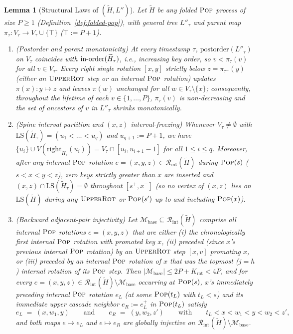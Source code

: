 \documentclass[11pt]{article}
\newtheorem{lemma}[theorem]{Lemma}
\theoremstyle{definition}
\theoremstyle{remark}
\newcommand{\LS}{\mathrm{LS}}
\newcommand{\POP}{\textnormal{\scshape Pop}}
\newcommand{\UPROT}{\textnormal{\scshape UpperRot}}
\begin{document}
\begin{lemma}[Structural Laws of $(\widetilde{H}, L'')$]
\label{lem:folded-laws}
Let $\widetilde{H}$ be any folded $\POP$ process of size $P \ge 1$ (Definition~\ref{def:folded-pop}), with general tree $L''_\tau$ and parent map $\pi_\tau : V_\tau \to V_\tau \cup \{\top\}$ ($\top := P + 1$).
\begin{enumerate}[label=(\arabic*)]
  \item \emph{(Postorder and parent monotonicity)} At every timestamp $\tau$, $\mathrm{postorder}(L''_\tau)$ on $V_\tau$ coincides with $\textnormal{in-order}(\widetilde{H}_\tau)$, i.e., increasing key order, so $v < \pi_\tau(v)$ for all $v \in V_\tau$. Every right single rotation $[x, y]$ strictly below $z = \pi_{\tau^-}(y)$ (either an $\UPROT$ step or an internal $\POP$ rotation) updates $\pi(x) : y \mapsto z$ and leaves $\pi(w)$ unchanged for all $w \in V_\tau \setminus \{x\}$; consequently, throughout the lifetime of each $v \in \{1, \dots, P\}$, $\pi_\tau(v)$ is non-decreasing and the set of ancestors of $v$ in $L''_\tau$ shrinks monotonically.
  \item \emph{(Spine interval partition and $(x, z)$ interval-freezing)} Whenever $V_\tau \ne \emptyset$ with $\LS(\widetilde{H}_\tau) = (u_1 < \dots < u_q)$ and $u_{q+1} := P + 1$, we have $\{u_i\} \cup V(\mathrm{right}_{\widetilde{H}_\tau}(u_i)) = V_\tau \cap [u_i, u_{i+1} - 1]$ for all $1 \le i \le q$. Moreover, after any internal $\POP$ rotation $e = (x, y, z) \in \mathcal{R}_{\mathrm{int}}(\widetilde{H})$ during $\POP(s)$ ($s < x < y < z$), zero keys strictly greater than $x$ are inserted and $(x, z) \cap \LS(\widetilde{H}_\tau) = \emptyset$ throughout $[s^+, x^-]$ (so no vertex of $(x, z)$ lies on $\LS(\widetilde{H})$ during any $\UPROT$ or $\POP(s')$ up to and including $\POP(x)$).
  \item \emph{(Backward adjacent-pair injectivity)} Let $\mathcal{M}_{\mathrm{base}} \subseteq \mathcal{R}_{\mathrm{int}}(\widetilde{H})$ comprise all internal $\POP$ rotations $e = (x, y, z)$ that are either (i) the chronologically first internal $\POP$ rotation with promoted key $x$, (ii) preceded (since $x$'s previous internal $\POP$ rotation) by an $\UPROT$ step $[x, v]$ promoting $x$, or (iii) preceded by an internal $\POP$ rotation of $x$ that was the topmost ($j = h$) internal rotation of its $\POP$ step. Then $|\mathcal{M}_{\mathrm{base}}| \le 2P + K_{\mathrm{rot}} < 4P$, and for every $e = (x, y, z) \in \mathcal{R}_{\mathrm{int}}(\widetilde{H}) \setminus \mathcal{M}_{\mathrm{base}}$ occurring at $\POP(s)$, $x$'s immediately preceding internal $\POP$ rotation $e_L$ (at some $\POP(t_L)$ with $t_L < s$) and its immediate upper cascade neighbor $e_R := e_L^+$ in $\POP(t_L)$ satisfy
  \[
  e_L \;=\; (x, w_1, y) \qquad\text{and}\qquad e_R \;=\; (y, w_2, z')
  \qquad\text{with}\qquad
  t_L < x < w_1 < y < w_2 < z',
  \]
  and both maps $e \mapsto e_L$ and $e \mapsto e_R$ are globally injective on $\mathcal{R}_{\mathrm{int}}(\widetilde{H}) \setminus \mathcal{M}_{\mathrm{base}}$.
\end{enumerate}
\end{lemma}
\end{document}

